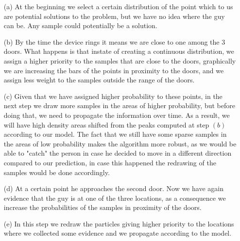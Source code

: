 \begin{itemize}
    \item [(a)] At the beginning we select a certain distribution of the point which to us are potential solutions to the problem, but we have no idea where the guy can be. Any sample could potentially be a solution.
    \item [(b)] By the time the device rings it means we are close to one among the 3 doors. What happens is that instate of creating a continuous distribution, we assign a higher priority to the samples that are close to the doors, graphically we are increasing the bars of the points in proximity to the doors, and we assign less weight to the samples outside the range of the doors.
    \item [(c)] Given that we have assigned higher probability to these points, in the next step we draw more samples in the areas of higher probability, but before doing that, we need to propagate the information over time. As a result, we will have high density areas shifted from the peaks computed at step $(b)$ according to our model. The fact that we still have some sparse samples in the areas of low probability makes the algorithm more robust, as we would be able to "catch" the person in case he decided to move in a different direction compared to our prediction, in case this happened the redrawing of the samples would be done accordingly.
    \item [(d)] At a certain point he approaches the second door. Now we have again evidence that the guy is at one of the three locations, as a consequence we increase the probabilities of the samples in proximity of the doors. 
    \item [(e)] In this step we redraw the particles giving higher priority to the locations where we collected some evidence and we propagate according to the model.
\end{itemize}